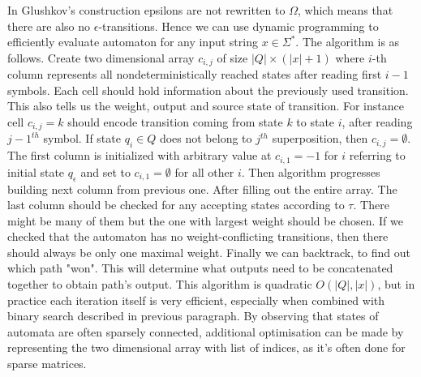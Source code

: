 \documentclass[journal]{journal}
\begin{document}
In Glushkov's construction epsilons are not rewritten to $\Omega$, which means that there are also no $\epsilon$-transitions. Hence we can use dynamic programming to efficiently evaluate automaton for any input string $x\in\Sigma^*$. The algorithm is as follows. Create two dimensional array $c_{i,j}$ of size $\vert Q \vert \times (\vert x \vert+1)$
where $i$-th column represents all nondeterministically reached states after reading first $i-1$ symbols. Each cell should hold information about the previously used transition. This also tells us the weight, output and source state of transition. For instance cell $c_{i,j}=k$ should encode transition coming from state $k$ to state $i$, after reading $j-1^{th}$ symbol. If state $q_i\in Q$ does not belong to $j^{th}$ superposition, then $c_{i,j}=\emptyset$. The first column is initialized with arbitrary value at $c_{i,1}=-1$ for $i$ referring to initial state $q_\epsilon$ and set to $c_{i,1}=\emptyset$ for all other $i$. Then algorithm progresses building next column from previous one. After filling out the entire array. The last column should be checked for any accepting states according to $\tau$. There might be many of them but the one with largest weight should be chosen. If we checked that the automaton has no weight-conflicting transitions, then there should always be only one maximal weight. Finally we can backtrack, to find out which path "won". This will determine what outputs need to be concatenated together to obtain path's output. This algorithm is quadratic $O(\vert Q\vert, \vert x \vert)$, but in practice each iteration itself is very efficient, especially when combined with binary search described in previous paragraph. By observing that states of automata are often sparsely connected, additional optimisation can be made by representing the two dimensional array with list of indices, as it's often done for sparse matrices.







%
%
\end{document}
